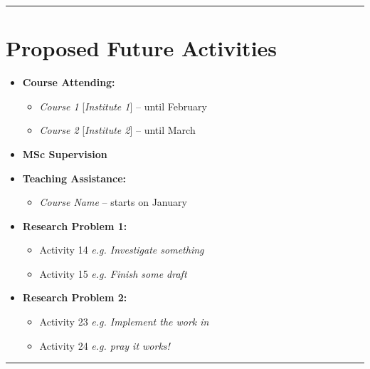 \documentclass[12pt]{article}
\theoremstyle{definition}
\begin{document}
\vspace{0.25cm}
\textcolor{ColorDef}{\hrule height 0.5pt}
\vspace{0.25cm}

\section*{Proposed Future Activities} 
\begin{itemize}
	
	\item \textbf{Course Attending:} 
	\begin{itemize}
		\item \emph{Course 1} [\emph{Institute 1}] -- until February 
		\item \emph{Course 2} [\emph{Institute 2}] -- until March 
	\end{itemize}
	
	\item \textbf{MSc Supervision}
	
	\item \textbf{Teaching Assistance:} 
	\begin{itemize}
		\item \emph{Course Name} -- starts on January  
	\end{itemize}
	
	\item \textbf{Research Problem 1:}
	\begin{itemize}
		\item Activity 14 \emph{e.g. Investigate something} 
		\item Activity 15 \emph{e.g. Finish some draft}
	\end{itemize}
	
	\item \textbf{Research Problem 2:} 
	\begin{itemize} 			
		\item Activity 23 \emph{e.g. Implement the work in \cite{CitationKey}}
		\item Activity 24 \emph{e.g. pray it works!} 
	\end{itemize}
	
\end{itemize}

\vspace{0.25cm}
\textcolor{ColorDef}{\hrule height 0.5pt}
\vspace{0.25cm}
\end{document}
